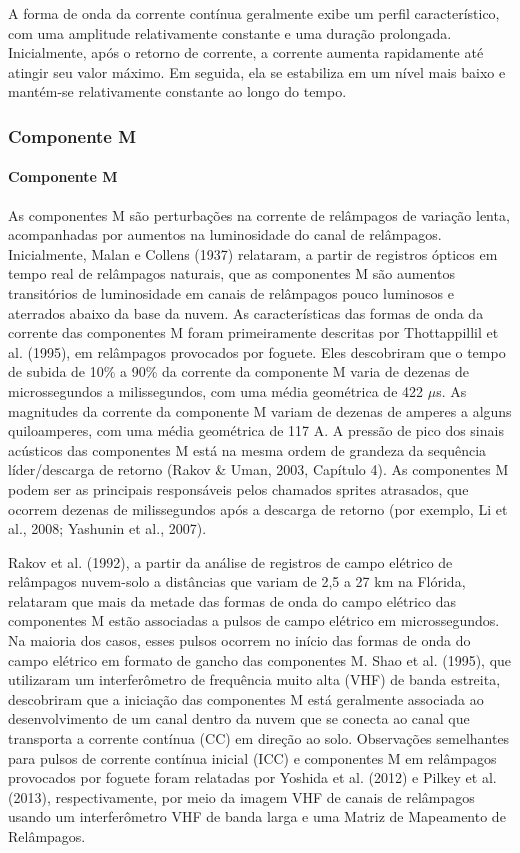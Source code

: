 \documentclass[a4paper, 12pt, onecolumn,singlespacing]{article}
\begin{document}
		A forma de onda da corrente contínua geralmente exibe um perfil característico, com uma amplitude relativamente constante e uma duração prolongada. Inicialmente, após o retorno de corrente, a corrente aumenta rapidamente até atingir seu valor máximo. Em seguida, ela se estabiliza em um nível mais baixo e mantém-se relativamente constante ao longo do tempo. 
	
	\subsubsection{Componente M}
		\paragraph{Componente M}
		As componentes M são perturbações na corrente de relâmpagos de variação lenta, acompanhadas por aumentos na luminosidade do canal de relâmpagos. Inicialmente, Malan e Collens (1937) relataram, a partir de registros ópticos em tempo real de relâmpagos naturais, que as componentes M são aumentos transitórios de luminosidade em canais de relâmpagos pouco luminosos e aterrados abaixo da base da nuvem. As características das formas de onda da corrente das componentes M foram primeiramente descritas por Thottappillil et al. (1995), em relâmpagos provocados por foguete. Eles descobriram que o tempo de subida de 10\% a 90\% da corrente da componente M varia de dezenas de microssegundos a milissegundos, com uma média geométrica de 422 $\mu$s. As magnitudes da corrente da componente M variam de dezenas de amperes a alguns quiloamperes, com uma média geométrica de 117 A. A pressão de pico dos sinais acústicos das componentes M está na mesma ordem de grandeza da sequência líder/descarga de retorno (Rakov \& Uman, 2003, Capítulo 4). As componentes M podem ser as principais responsáveis pelos chamados sprites atrasados, que ocorrem dezenas de milissegundos após a descarga de retorno (por exemplo, Li et al., 2008; Yashunin et al., 2007).
	
		Rakov et al. (1992), a partir da análise de registros de campo elétrico de relâmpagos nuvem-solo a distâncias que variam de 2,5 a 27 km na Flórida, relataram que mais da metade das formas de onda do campo elétrico das componentes M estão associadas a pulsos de campo elétrico em microssegundos. Na maioria dos casos, esses pulsos ocorrem no início das formas de onda do campo elétrico em formato de gancho das componentes M. Shao et al. (1995), que utilizaram um interferômetro de frequência muito alta (VHF) de banda estreita, descobriram que a iniciação das componentes M está geralmente associada ao desenvolvimento de um canal dentro da nuvem que se conecta ao canal que transporta a corrente contínua (CC) em direção ao solo. Observações semelhantes para pulsos de corrente contínua inicial (ICC) e componentes M em relâmpagos provocados por foguete foram relatadas por Yoshida et al. (2012) e Pilkey et al. (2013), respectivamente, por meio da imagem VHF de canais de relâmpagos usando um interferômetro VHF de banda larga e uma Matriz de Mapeamento de Relâmpagos.
		
\end{document}
